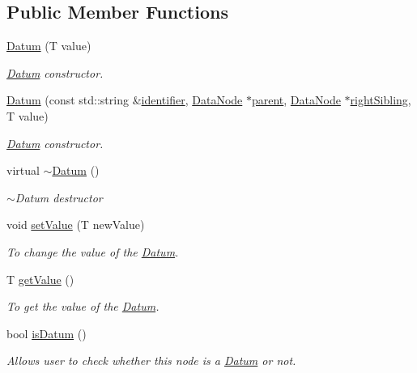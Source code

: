 \subsection*{Public Member Functions}
\begin{DoxyCompactItemize}
\item 
\hyperlink{classDatabase_1_1Datum_a6c8c58a7e440ababc4f0a87f5da4d387}{Datum} (T value)
\begin{DoxyCompactList}\small\item\em \hyperlink{classDatabase_1_1Datum}{Datum} constructor. \end{DoxyCompactList}\item 
\hyperlink{classDatabase_1_1Datum_af00751a057fe19a929a979d7a925ef0a}{Datum} (const std\+::string \&\hyperlink{classDatabase_1_1DataNode_ace59a7fba9c490d2dae59c4af7b0c71f}{identifier}, \hyperlink{classDatabase_1_1DataNode}{Data\+Node} $\ast$\hyperlink{classDatabase_1_1DataNode_a8d70472d0f14aa3ae3ee74d9f3e879d6}{parent}, \hyperlink{classDatabase_1_1DataNode}{Data\+Node} $\ast$\hyperlink{classDatabase_1_1DataNode_ae335fc33c3813e8a6638d50faef44d5d}{right\+Sibling}, T value)
\begin{DoxyCompactList}\small\item\em \hyperlink{classDatabase_1_1Datum}{Datum} constructor. \end{DoxyCompactList}\item 
virtual \hyperlink{classDatabase_1_1Datum_a973e321d98f8be376fd8ec772446f480}{$\sim$\+Datum} ()\hypertarget{classDatabase_1_1Datum_a973e321d98f8be376fd8ec772446f480}{}\label{classDatabase_1_1Datum_a973e321d98f8be376fd8ec772446f480}

\begin{DoxyCompactList}\small\item\em $\sim$\+Datum destructor \end{DoxyCompactList}\item 
void \hyperlink{classDatabase_1_1Datum_a636a8ed59bfcb2947100f8181a9b5c73}{set\+Value} (T new\+Value)
\begin{DoxyCompactList}\small\item\em To change the value of the \hyperlink{classDatabase_1_1Datum}{Datum}. \end{DoxyCompactList}\item 
T \hyperlink{classDatabase_1_1Datum_a1965d14f29d7bc7369ce1d96f529124f}{get\+Value} ()
\begin{DoxyCompactList}\small\item\em To get the value of the \hyperlink{classDatabase_1_1Datum}{Datum}. \end{DoxyCompactList}\item 
bool \hyperlink{classDatabase_1_1Datum_a81a243020da7294ad331b50d45b86ad8}{is\+Datum} ()
\begin{DoxyCompactList}\small\item\em Allows user to check whether this node is a \hyperlink{classDatabase_1_1Datum}{Datum} or not. \end{DoxyCompactList}\end{DoxyCompactItemize}
